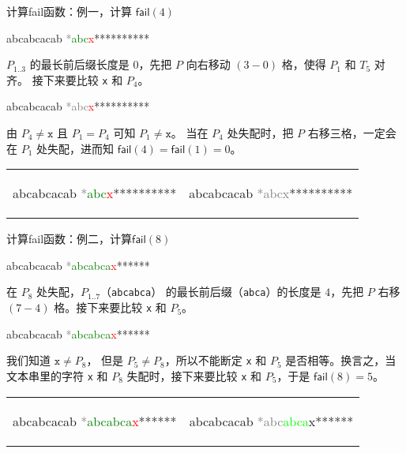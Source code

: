 \documentclass{ctexbeamer}
\newcommand{\red}[1]{\textcolor{red}{#1}}
\newcommand{\green}[1]{\textcolor{green}{#1}}
\newcommand{\gray}[1]{\textcolor{gray}{#1}}
\newcommand{\lime}[1]{\textcolor{lime}{#1}}
\newcommand{\str}[1]{\texttt{#1}}
\newcommand{\fail}{\mathsf{fail}}
\begin{document}
\begin{frame}[fragile]{计算fail函数：例一，计算 $\fail(4)$}

\begin{tverb}
 abcabcacab
\gray{*}\green{abc}\red{x}{**********}
\end{tverb}

$P_{1..3}$ 的最长前后缀长度是 $0$，先把 $P$ 向右移动 $(3-0)$ 格，使得 $P_1$ 和 $T_5$ 对齐。
接下来要比较 \str{x} 和 $P_4$。

\begin{block}{}
\begin{tverb}
    abcabcacab
\gray{*abc}\red{x}{**********}
\end{tverb}
由 $P_4 \ne \str{x}$ 且 $P_1 = P_4$ 可知 $P_1 \ne \str{x}$。
当在 $P_4$ 处失配时，把 $P$ 右移三格，一定会在 $P_1$ 处失配，进而知 $\fail(4) = \fail(1) = 0$。
\end{block}



\begin{tabular}{p{} p{}}
\begin{tverb}
 abcabcacab
\gray{*}\green{abc}\red{x}{**********}
\end{tverb}
 &
\begin{tverb}
     abcabcacab
\gray{*abcx}{**********}
\end{tverb}

\end{tabular}
\end{frame}


\begin{frame}[fragile]{计算fail函数：例二，计算$\fail(8)$}

\begin{tverb}
 abcabcacab
\gray{*}\green{abcabca}\red{x}******
\end{tverb}

在 $P_8$ 处失配，$P_{1..7}$（\str{abcabca}） 的最长前后缀（\str{abca}）的长度是 $4$，先把 $P$ 右移 $(7 - 4)$ 格。接下来要比较 \str{x} 和 $P_5$。

\begin{tverb}
    abcabcacab
\gray{*}\green{abcabca}\red{x}******
\end{tverb}

我们知道 $\str{x} \ne P_8$， 但是 $P_5 \ne P_8$，所以不能断定 \str{x} 和 $P_5$ 是否相等。换言之，当文本串里的字符 \str{x} 和 $P_8$ 失配时，接下来要比较 \str{x} 和 $P_5$，于是 $\fail(8) = 5$。

\begin{tabular}{p{} p{}}
\begin{tverb}
 abcabcacab
\gray{*}\green{abcabca}\red{x}******
\end{tverb}
 &
\begin{tverb}
    abcabcacab
\gray{*abc}\lime{abca}x******
\end{tverb}

\end{tabular}

\end{frame}
\end{document}
